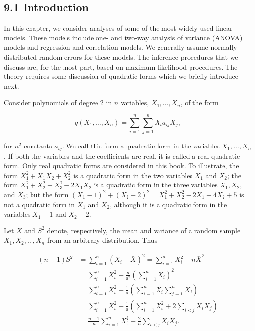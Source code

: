 \subsection*{9.1 Introduction}
In this chapter, we consider analyses of some of the most widely used linear models. These models include one- and two-way analysis of variance (ANOVA) models and regression and correlation models. We generally assume normally distributed random errors for these models. The inference procedures that we discuss are, for the most part, based on maximum likelihood procedures. The theory requires some discussion of quadratic forms which we briefly introduce next.

Consider polynomials of degree 2 in $n$ variables, $X_{1}, \ldots, X_{n}$, of the form

$$
q\left(X_{1}, \ldots, X_{n}\right)=\sum_{i=1}^{n} \sum_{j=1}^{n} X_{i} a_{i j} X_{j},
$$

for $n^{2}$ constants $a_{i j}$. We call this form a quadratic form in the variables $X_{1}, \ldots, X_{n}$. If both the variables and the coefficients are real, it is called a real quadratic form. Only real quadratic forms are considered in this book. To illustrate, the form $X_{1}^{2}+X_{1} X_{2}+X_{2}^{2}$ is a quadratic form in the two variables $X_{1}$ and $X_{2}$; the form $X_{1}^{2}+X_{2}^{2}+X_{3}^{2}-2 X_{1} X_{2}$ is a quadratic form in the three variables $X_{1}, X_{2}$, and $X_{3}$; but the form $\left(X_{1}-1\right)^{2}+\left(X_{2}-2\right)^{2}=X_{1}^{2}+X_{2}^{2}-2 X_{1}-4 X_{2}+5$ is not a quadratic form in $X_{1}$ and $X_{2}$, although it is a quadratic form in the variables $X_{1}-1$ and $X_{2}-2$.

Let $\bar{X}$ and $S^{2}$ denote, respectively, the mean and variance of a random sample\\
$X_{1}, X_{2}, \ldots, X_{n}$ from an arbitrary distribution. Thus

$$
\begin{aligned}
(n-1) S^{2} & =\sum_{i=1}^{n}\left(X_{i}-\bar{X}\right)^{2}=\sum_{i=1}^{n} X_{i}^{2}-n \bar{X}^{2} \\
& =\sum_{i=1}^{n} X_{i}^{2}-\frac{n}{n^{2}}\left(\sum_{i=1}^{n} X_{i}\right)^{2} \\
& =\sum_{i=1}^{n} X_{i}^{2}-\frac{1}{n}\left(\sum_{i=1}^{n} X_{i} \sum_{j=1}^{n} X_{j}\right) \\
& =\sum_{i=1}^{n} X_{i}^{2}-\frac{1}{n}\left(\sum_{i=1}^{n} X_{i}^{2}+2 \sum_{i<j} X_{i} X_{j}\right) \\
& =\frac{n-1}{n} \sum_{i=1}^{n} X_{i}^{2}-\frac{2}{n} \sum_{i<j} X_{i} X_{j} .
\end{aligned}
$$

